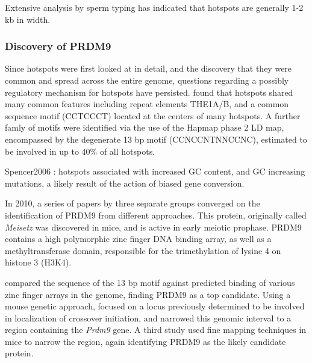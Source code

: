 Extensive analysis by sperm typing has indicated that hotspots are generally 1-2 kb in width\cite{Jeffreys2004a,Arnheim2003}.


\subsubsection{Discovery of PRDM9}

Since hotspots were first looked at in detail, and the discovery that they were common and spread across the entire genome, questions regarding a possibly regulatory mechanism for hotspots have persisted.
\citet{Myers2005} found that hotspots shared many common features including repeat elements THE1A/B, and a common sequence motif (CCTCCCT) located at the centers of many hotspots.
A further famly of motifs were identified via the use of the Hapmap phase 2 LD map\cite{Hapmap2007}, encompassed by the degenerate 13 bp motif (CCNCCNTNNCCNC)\cite{Myers2008}, estimated to be involved in up to 40\% of all hotspots.

Spencer2006 : hotspots associated with increased GC content, and GC increasing mutations, a likely result of the action of biased gene conversion.


In 2010, a series of papers by three separate groups converged on the identification of PRDM9 from different approaches.
This protein, originally called \textit{Meisetz} was discovered in mice, and is active in early meiotic prophase\cite{Hayashi2005}.
PRDM9 contains a high polymorphic zinc finger DNA binding array, as well as a methyltransferase domain, responsible for the trimethylation of lysine 4 on histone 3 (H3K4).

\citet{Myers2010} compared the sequence of the 13 bp motif against predicted binding of various zinc finger arrays in the genome, finding PRDM9 as a top candidate.
Using a mouse genetic approach, \citet{Baudat2010} focused on a locus previously determined to be involved in localization of crossover initiation\cite{Grey2009,Parvanov2009},
and narrowed this genomic interval to a region containing the \textit{Prdm9} gene.
A third study used fine mapping techniques in mice to narrow the region, again identifying PRDM9 as the likely candidate protein\cite{Parvanov2010}.



